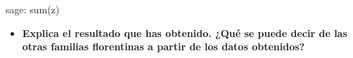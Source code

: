 \begin{sagecommandline}
    sage: sum(z)
\end{sagecommandline}

\newpage 
\begin{ejer}
    \begin{itemize}
        \item \textbf{Explica el resultado que has obtenido. ¿Qué se puede decir de las otras familias florentinas a partir de los datos obtenidos?}
    \end{itemize}
\end{ejer}

